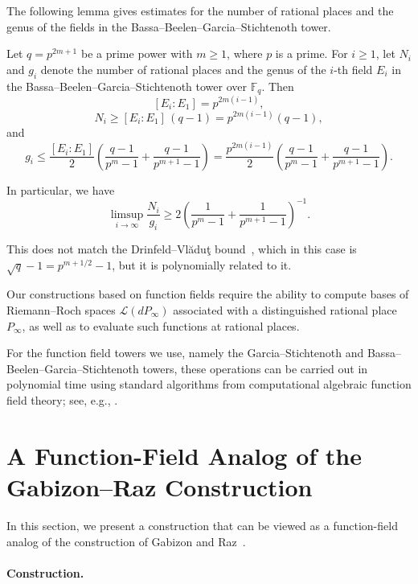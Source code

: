 \documentclass[11pt]{article}
\newcommand{\F}{\mathbb{F}}
\begin{document}
The following lemma gives estimates for the number of rational places and the genus of the fields in the Bassa--Beelen--Garcia--Stichtenoth tower.

\begin{lemma}\label{lem:BGGS}
Let $q=p^{2m+1}$ be a prime power with $m\geq 1$, where $p$ is a prime. For $i\ge 1$, let $N_i$ and $g_i$ denote the number of rational places and the genus of the $i$-th field $E_i$ in the Bassa--Beelen--Garcia--Stichtenoth tower over $\F_q$. Then
\[
[E_i:E_1]=p^{2m(i-1)},
\]
\[
N_i\ge [E_i:E_1]\,(q-1)=p^{2m(i-1)}(q-1),
\]
and
\[
g_i \le \frac{[E_i:E_1]}{2}\left(\frac{q-1}{p^{m}-1}+\frac{q-1}{p^{m+1}-1}\right)= \frac{p^{2m(i-1)}}{2}\left(\frac{q-1}{p^{m}-1}+\frac{q-1}{p^{m+1}-1}\right).
\]
\end{lemma}

In particular, we have
\[
\limsup_{i\to\infty}\frac{N_i}{g_i}\ge
2\left(\frac{1}{p^{m}-1}+\frac{1}{p^{m+1}-1}\right)^{-1}.
\]

This does not match the Drinfeld--Vl\u{a}du\c{t} bound~\cite{VS83},
which in this case is $\sqrt{q}-1=p^{m+1/2}-1$, but it is polynomially related to it.

\begin{remark}
Our constructions based on function fields require the ability to compute bases of
Riemann--Roch spaces $\mathcal{L}(dP_\infty)$ associated with a distinguished rational place $P_\infty$, as well as to evaluate such functions at rational places.

For the function field towers we use, namely the Garcia--Stichtenoth and
Bassa--Beelen--Garcia--Stichtenoth towers, these operations can be carried out
in polynomial time using standard algorithms from computational algebraic function field
theory; see, e.g., \cite{He02,SAKSD02}.
\end{remark}


\section{A Function-Field Analog of the Gabizon--Raz Construction}\label{sec:basic}

In this section, we present a construction that can be viewed as a function-field analog of the construction of Gabizon and Raz~\cite{GR08}.

\paragraph{Construction.}
\end{document}
